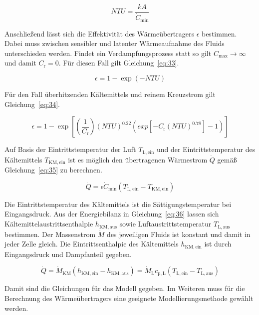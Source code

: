 \begin{equation}
\label{eq:32}
NTU = \frac{kA}{\dot{C}_\mathrm{min}}
\end{equation}

Anschließend lässt sich die Effektivität des Wärmeübertragers $\epsilon$ bestimmen.
Dabei muss zwischen sensibler und latenter Wärmeaufnahme des Fluids unterschieden werden. Findet ein Verdampfungsprozess statt so gilt $C_{\mathrm{max}}\longrightarrow\infty$ und damit $C_\mathrm{r} =0$. Für diesen Fall gilt Gleichung~\ref{eq:33}.

\begin{equation}
\label{eq:33}
\epsilon = 1- \exp{(-NTU)}
\end{equation}

Für den Fall überhitzenden Kältemittels und reinem Kreuzstrom gilt Gleichung~\ref{eq:34}.

\begin{equation}
\label{eq:34}
\epsilon = 1- \exp{\left[\left(\frac{1}{C_\mathrm{r}}\right)(NTU)^{0.22}(exp{[-C_\mathrm{r}(NTU)^{0.78}]}-1)\right]}
\end{equation}


Auf Basis der Eintrittstemperatur der Luft $T_{\mathrm{L,ein}}$ und der Eintrittstemperatur des Kältemittels $T_{\mathrm{KM,ein}}$ ist es möglich den übertragenen Wärmestrom $\dot{Q}$ gemäß Gleichung~\ref{eq:35} zu berechnen. 

\begin{equation}
\label{eq:35}
\dot{Q} = \epsilon \dot{C}_{\mathrm{min}} (T_{\mathrm{L,ein}} - T_{\mathrm{KM,ein}})
\end{equation}

Die Eintrittstemperatur des Kältemittels ist die Sättigungstemperatur bei Eingangsdruck. Aus der Energiebilanz in Gleichung~\ref{eq:36} lassen sich Kältemittelaustrittsenthalpie $h_{\mathrm{KM,aus}}$ sowie Luftaustrittstemperatur $T_{\mathrm{L,aus}}$ bestimmen. Der Massenstrom $\dot{M}$ des jeweiligen Fluids ist konstant und damit in jeder Zelle gleich. Die Eintrittsenthalpie des Kältemittels $h_{\mathrm{KM,ein}}$ ist durch Eingangsdruck und Dampfanteil gegeben.

\begin{equation}
\label{eq:36}
\dot{Q} = \dot{M}_{\mathrm{KM}} (h_{\mathrm{KM,ein}} - h_{\mathrm{KM,aus}}) = \dot{M}_{\mathrm{L}} c_{\mathrm{p,L}}(T_{\mathrm{L,ein}} - T_{\mathrm{L,aus}})
\end{equation}

Damit sind die Gleichungen für das Modell gegeben. Im Weiteren muss für die Berechnung des Wärmeübertragers eine geeignete Modellierungsmethode gewählt werden.


